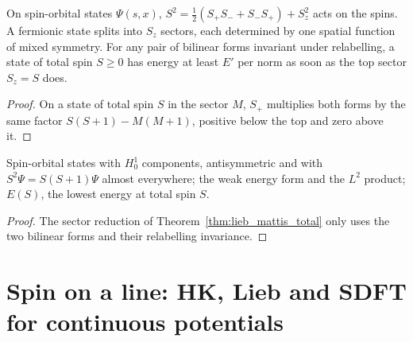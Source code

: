 \begin{theorem}
  \label{thm:lieb_mattis_total}
  \leanok
  On spin-orbital states $\Psi(s,x)$, $S^2=\tfrac12(S_+S_-+S_-S_+)+S_z^2$ acts on the spins. A fermionic state splits
  into $S_z$ sectors, each determined by one spatial function of mixed symmetry. For any pair of bilinear forms
  invariant under relabelling, a state of total spin $S\ge0$ has energy at least $E'$ per norm as soon as the top
  sector $S_z=S$ does.
\end{theorem}
\begin{proof}
  \leanok
  On a state of total spin $S$ in the sector $M$, $S_+$ multiplies both forms by the same factor
  $S(S+1)-M(M+1)$, positive below the top and zero above it.
\end{proof}

\begin{theorem}
  \label{thm:lieb_mattis_total_W}
  \leanok
  Spin-orbital states with $H^1_0$ components, antisymmetric and with $S^2\Psi=S(S+1)\Psi$ almost everywhere; the
  weak energy form and the $L^2$ product; $E(S)$, the lowest energy at total spin $S$.
\end{theorem}
\begin{proof}
  \leanok
  The sector reduction of Theorem~\ref{thm:lieb_mattis_total} only uses the two bilinear forms and their relabelling
  invariance.
\end{proof}

\section{Spin on a line: HK, Lieb and SDFT for continuous potentials}


